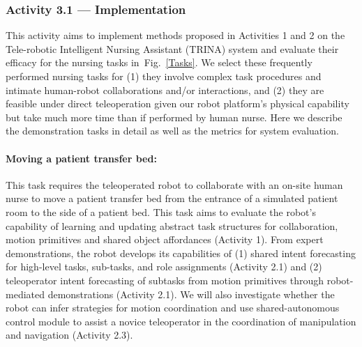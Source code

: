 \documentclass[letterpaper, 11 pt, onecolumn]{article}
\newcommand{\fig}[1]{Fig.~\ref{#1}}
\begin{document}
\subsubsection{Activity 3.1 --- Implementation}\label{sec:plan-evaluation-implementation}
This activity aims to implement methods proposed in Activities 1 and 2 on the Tele-robotic Intelligent Nursing Assistant (TRINA) system and evaluate their efficacy for the nursing tasks in~\fig{Tasks}. We select these frequently performed nursing tasks for (1) they involve complex task procedures and intimate human-robot collaborations and/or interactions, and (2) they are feasible under direct teleoperation given our robot platform's physical capability but take much more time than if performed by human nurse. Here we describe the demonstration tasks in detail as well as the metrics for system evaluation.

\paragraph*{Moving a patient transfer bed:} This task requires the teleoperated robot to collaborate with an on-site human nurse to move a patient transfer bed from the entrance of a simulated patient room to the side of a patient bed. This task aims to evaluate the robot's capability of learning and updating abstract task structures for collaboration, motion primitives and shared object affordances (Activity 1). From expert demonstrations, the robot develops its capabilities of (1) shared intent forecasting for high-level tasks, sub-tasks, and role assignments (Activity 2.1) and (2) teleoperator intent forecasting of subtasks from motion primitives through robot-mediated demonstrations (Activity 2.1). We will also investigate whether the robot can infer strategies for motion coordination and use shared-autonomous control module to assist a novice teleoperator in the coordination of manipulation and navigation (Activity 2.3). 
\end{document}
